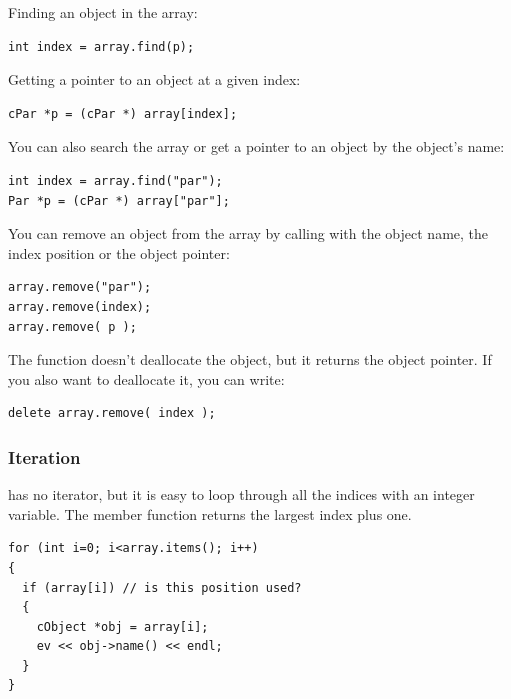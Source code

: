 Finding an object in the array:

\begin{verbatim}
int index = array.find(p);
\end{verbatim}

Getting a pointer to an object at a given index:

\begin{verbatim}
cPar *p = (cPar *) array[index];
\end{verbatim}

You can also search the array or get a pointer to an object by
the object's name:

\begin{verbatim}
int index = array.find("par");
Par *p = (cPar *) array["par"];
\end{verbatim}


You can remove an object from the array by calling 
with the object name, the index position or the object pointer:

\begin{verbatim}
array.remove("par");
array.remove(index);
array.remove( p );
\end{verbatim}


The  function doesn't deallocate the object, but it
returns the object pointer. If you also want to deallocate it, you can
write:

\begin{verbatim}
delete array.remove( index );
\end{verbatim}

\subsubsection{Iteration}


 has no iterator, but it is easy to loop through all the
indices with an integer variable. The  member function
returns the largest index plus one.

\begin{verbatim}
for (int i=0; i<array.items(); i++)
{
  if (array[i]) // is this position used?
  {
    cObject *obj = array[i];
    ev << obj->name() << endl;
  }
}
\end{verbatim}


%
%
%
%




